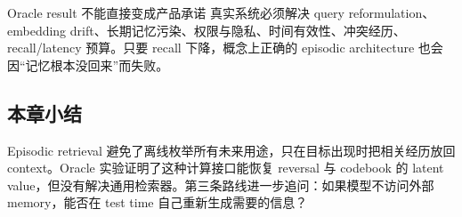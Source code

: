 
\begin{warningbox}{Oracle result 不能直接变成产品承诺}
真实系统必须解决 query reformulation、embedding drift、长期记忆污染、权限与隐私、时间有效性、冲突经历、recall/latency 预算。只要 recall 下降，概念上正确的 episodic architecture 也会因“记忆根本没回来”而失败。
\end{warningbox}

\subsection{本章小结}

Episodic retrieval 避免了离线枚举所有未来用途，只在目标出现时把相关经历放回 context。Oracle 实验证明了这种计算接口能恢复 reversal 与 codebook 的 latent value，但没有解决通用检索器。第三条路线进一步追问：如果模型不访问外部 memory，能否在 test time 自己重新生成需要的信息？

